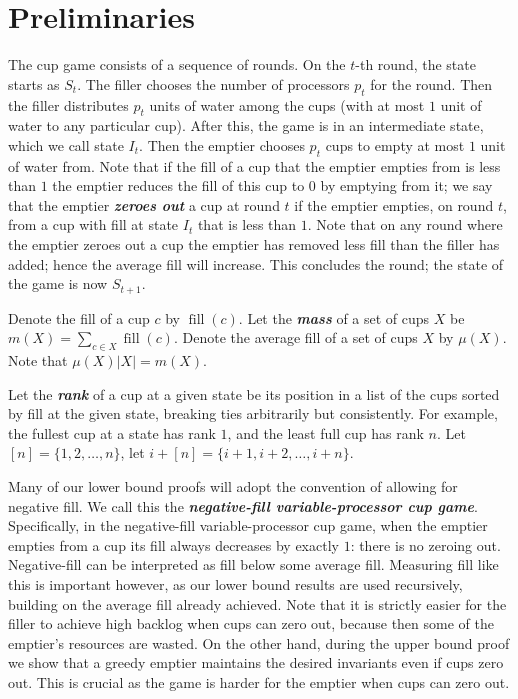 \documentclass[twocolumn]{article}[10pt]
\newcommand{\defn}[1]{{\textit{\textbf{\boldmath #1}}}\xspace}
\DeclareMathOperator{\fil}{\text{fill}}
\begin{document}
\section{Preliminaries}\label{sec:prelims}
The cup game consists of a sequence of rounds. On the $t$-th round, the state
starts as $S_t$. The filler chooses the number of processors $p_t$ for the
round. Then the filler distributes $p_t$ units of water among the cups (with at
most $1$ unit of water to any particular cup). After this, the game is in an
intermediate state, which we call state $I_t$. Then the emptier chooses $p_t$
cups to empty at most $1$ unit of water from. Note that if the fill of a cup
that the emptier empties from is less than $1$ the emptier reduces the fill of
this cup to $0$ by emptying from it; we say that the emptier \defn{zeroes out}
a cup at round $t$ if the emptier empties, on round $t$, from a cup with fill
at state $I_t$ that is less than $1$. Note that on any round where the emptier
zeroes out a cup the emptier has removed less fill than the filler has added;
hence the average fill will increase. This concludes the round; the state of
the game is now $S_{t+1}$.

Denote the fill of a cup $c$ by $\fil(c)$. 
Let the \defn{mass} of a set of cups $X$ be $m(X) = \sum_{c\in X} \fil(c)$. 
Denote the average fill of a set of cups $X$ by $\mu(X)$. Note that $\mu(X) |X| = m(X)$.

Let the \defn{rank} of a cup at a given state be its position in a list of the
cups sorted by fill at the given state, breaking ties arbitrarily but
consistently. For example, the fullest cup at a state has rank $1$, and the
least full cup has rank $n$. Let $[n] = \{1,2,\ldots, n\}$, let
$i+[n] = \{i+1, i+2, \ldots, i+n\}$.

Many of our lower bound proofs will adopt the convention of allowing for
negative fill. We call this the \defn{negative-fill variable-processor cup
game}. Specifically, in the negative-fill variable-processor cup game, when the
emptier empties from a cup its fill always decreases by exactly $1$: there is
no zeroing out. Negative-fill can be interpreted as fill below some average
fill. Measuring fill like this is important however, as our lower bound results
are used recursively, building on the average fill already achieved. Note that
it is strictly easier for the filler to achieve high backlog when cups can zero
out, because then some of the emptier's resources are wasted. On the other hand,
during the upper bound proof we show that a greedy emptier maintains the
desired invariants even if cups zero out. This is crucial as the game is harder
for the emptier when cups can zero out.
\end{document}
